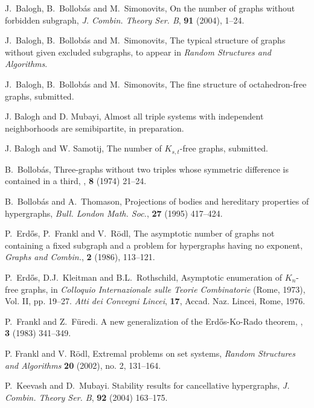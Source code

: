 \documentclass[11pt]{article}
\begin{document}
\begin{thebibliography}{99}

 J.~Balogh, B.~Bollob\'as and M.~Simonovits,
On the number of graphs without forbidden subgraph, {\em J. Combin. Theory Ser. B}, \textbf{91} (2004), 1--24.

 J.~Balogh, B.~Bollob\'as and M.~Simonovits, The typical structure of graphs without given excluded
subgraphs, to appear in \emph{Random Structures and Algorithms}.

 J.~Balogh, B.~Bollob\'as and M.~Simonovits, The fine structure of octahedron-free graphs, submitted.

 J. Balogh and D. Mubayi, Almost all triple systems with independent neighborhoods
are semibipartite, in preparation.

 J. Balogh and W. Samotij, The number of $K_{s,t}$-free graphs, submitted.

B.~{Bollob\'as},
\newblock Three-graphs without two triples whose symmetric difference is
  contained in a third,
, {\bf 8} (1974) 21--24.

  B.~Bollob\'as and A.~Thomason,  Projections of bodies and hereditary  properties of hypergraphs,
{\em Bull. London Math. Soc.}, {\bf 27} (1995) 417--424.

 P.~Erd\H{o}s, P.~Frankl and V.~R\"odl, The asymptotic number of graphs not
containing a fixed subgraph and a problem for hypergraphs having no exponent, {\em Graphs and Combin.},
{\bf 2} (1986), 113--121.

 P.~Erd\H{o}s, D.J.~Kleitman and B.L.~Rothschild, Asymptotic enumeration of $K_{n}$-free graphs,
in {\em  Colloquio Internazionale sulle Teorie Combinatorie} (Rome, 1973), Vol. II, pp. 19--27.
{\em Atti dei Convegni Lincei}, {\bf 17}, Accad. Naz. Lincei, Rome, 1976.



P.~Frankl and Z.~F{\"u}redi.
\newblock A new generalization of the {E}rd{\H o}s-{K}o-{R}ado theorem,
, {\bf 3} (1983) 341--349.


 P. Frankl and V. R\"odl, Extremal problems on set systems,  {\em Random Structures and Algorithms}  {\bf 20}  (2002),
no. 2, 131--164.

P.~Keevash and D.~Mubayi.
 Stability results for cancellative hypergraphs,
 {\em J. Combin. Theory Ser. B}, {\bf 92} (2004) 163--175.


\end{thebibliography}
\end{document}
